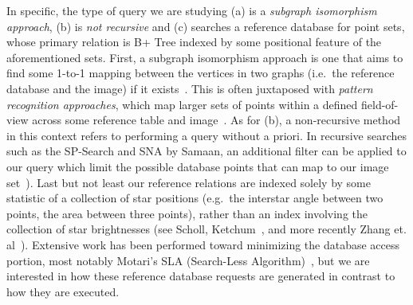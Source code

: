In specific, the type of query we are studying (a) is a \emph{subgraph isomorphism approach}, (b) is \emph{not recursive} and (c) searches a reference database for point sets, whose primary relation is B+ Tree indexed by some positional feature of the aforementioned sets.
First, a subgraph isomorphism approach is one that aims to find some 1-to-1 mapping between the vertices in two graphs (i.e.\ the reference database and the image) if it exists~\cite{scott:graphIsomorphismProblem}.
This is often juxtaposed with \emph{pattern recognition approaches}, which map larger sets of points within a defined field-of-view across some reference table and image~\cite{padgett:gridAlgorithm}.
As for (b), a non-recursive method in this context refers to performing a query without a priori.
In recursive searches such as the SP-Search and SNA by Samaan, an additional filter can be applied to our query which limit the possible database points that can map to our image set~\cite{samaan:recursiveMode}).
Last but not least our reference relations are indexed solely by some statistic of a collection of star positions (e.g.\ the interstar angle between two points, the area between three points), rather than an index involving the collection of star brightnesses (see Scholl\cite{scholl:starFieldIdentification}, Ketchum~\cite{ketchum:onboardStarIdentification}, and more recently Zhang et. al~\cite{zhang:brightnessReferenced}).
Extensive work has been performed toward minimizing the database access portion, most notably Motari's SLA (Search-Less Algorithm)~\cite{mortari:kVectorApproach}, but we are interested in how these reference database requests are generated in contrast to how they are executed.


